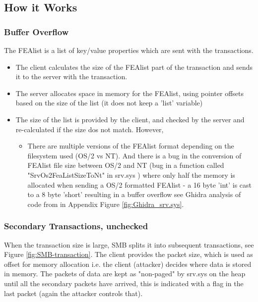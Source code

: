 \documentclass[
	letterpaper, %
	10pt, %
	unnumberedsections, %
	twoside, %
]{LTJournalArticle}
\begin{document}
\subsection{How it Works}

\subsubsection{Buffer Overflow}
The FEAlist is a list of key/value properties which are sent with the transactions. 

\begin{itemize}
	\item The client calculates the size of the FEAlist part of the transaction and sends it to the server with the transaction.  
	\item The server allocates space in memory for the FEAlist, using pointer offsets based on the size of the list (it does not keep a 'list' variable)
	\item The size of the list is provided by the client, and checked by the server and re-calculated if the size dos not match. However, 
	\begin{itemize}
		\item There are multiple versions of the FEAlist format depending on the filesystem used (OS/2 vs NT). And there is a bug in the conversion of FEAlist file size between OS/2 and NT (bug in a function called "SrvOs2FeaListSizeToNt" in srv.sys \cite{h3xduck}) where only half the memory is allocated when sending a OS/2 formatted FEAlist - a 16 byte 'int' is cast to a 8 byte 'short' resulting in a buffer overflow see Ghidra analysis of code from \cite{h3xduck} in Appendix Figure \ref{fig:Ghidra_srv.sys}. 
	\end{itemize}
\end{itemize}


\subsubsection{Secondary Transactions, unchecked}
When the transaction size is large, SMB splits it into subsequent transactions, see Figure \ref{fig:SMB-transaction}. The client provides the packet size, which is used as offset for memory allocation i.e. the client (attacker) decides where data is stored in memory. The packets of data are kept as "non-paged" by srv.sys on the heap until all the secondary packets have arrived, this is indicated with a flag in the last packet (again the attacker controls that). 
\end{document}
